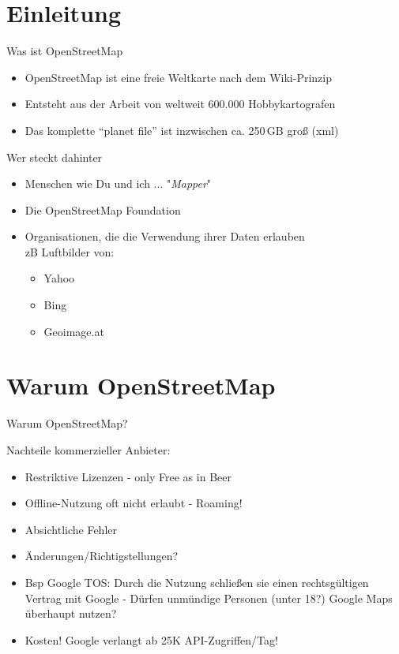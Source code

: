 \documentclass{beamer}
\begin{document}
\section{Einleitung}

\begin{frame}{Was ist OpenStreetMap}

\begin{itemize}
  \item OpenStreetMap ist eine freie Weltkarte nach dem Wiki-Prinzip
  \item Entsteht aus der Arbeit von weltweit 600.000 Hobbykartografen
  \item Das komplette ``planet file'' ist inzwischen ca. 250\,GB groß (xml)
\end{itemize}


\end{frame}

\begin{frame}{Wer steckt dahinter}
  \begin{itemize}
    \item Menschen wie Du und ich ... "\emph{Mapper}"
    \item Die OpenStreetMap Foundation
    \item Organisationen, die die Verwendung ihrer Daten erlauben \\
    zB Luftbilder von:
    \begin{itemize}
      \item Yahoo
      \item Bing
      \item Geoimage.at
    \end{itemize}
  \end{itemize}

\end{frame}



\section{Warum OpenStreetMap}

\begin{frame}{Warum OpenStreetMap?}

Nachteile kommerzieller Anbieter:

\begin{itemize}
  \item Restriktive Lizenzen - only Free as in Beer
  \item Offline-Nutzung oft nicht erlaubt - Roaming!
  \item Absichtliche Fehler
  \item Änderungen/Richtigstellungen?
  \pause
  \item Bsp Google TOS: Durch die Nutzung schließen sie einen rechtsgültigen Vertrag mit Google - Dürfen unmündige Personen (unter 18?) Google Maps überhaupt nutzen?
  \item Kosten! Google verlangt ab 25K API-Zugriffen/Tag!
\end{itemize}

\end{frame}
\end{document}
